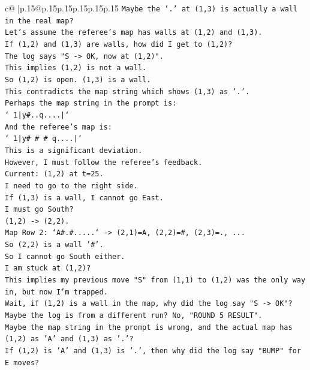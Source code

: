 \documentclass{article}
\begin{document}
{\begin{supertabular}{c@{$\;$}|p{.15\linewidth}@{}p{.15\linewidth}p{.15\linewidth}p{.15\linewidth}p{.15\linewidth}p{.15\linewidth}}
{{{\texttt{Maybe the '.' at (1,3) is actually a wall in the real map?} \\
\texttt{Let's assume the referee's map has walls at (1,2) and (1,3).} \\
\texttt{If (1,2) and (1,3) are walls, how did I get to (1,2)?} \\
\texttt{The log says "S {-}> OK, now at (1,2)".} \\
\texttt{This implies (1,2) is not a wall.} \\
\texttt{So (1,2) is open. (1,3) is a wall.} \\
\texttt{This contradicts the map string which shows (1,3) as '.'.} \\
\texttt{Perhaps the map string in the prompt is:} \\
\texttt{` 1|y\#..q....|`} \\
\texttt{And the referee's map is:} \\
\texttt{` 1|y\# \# \# q....|`} \\
\texttt{This is a significant deviation.} \\
\texttt{However, I must follow the referee's feedback.} \\
\texttt{Current: (1,2) at t=25.} \\
\texttt{I need to go to the right side.} \\
\texttt{If (1,3) is a wall, I cannot go East.} \\
\texttt{I must go South?} \\
\texttt{(1,2) {-}> (2,2).} \\
\texttt{Map Row 2: `A\#.\#.....` {-}> (2,1)=A, (2,2)=\#, (2,3)=., ...} \\
\texttt{So (2,2) is a wall '\#'.} \\
\texttt{So I cannot go South either.} \\
\texttt{I am stuck at (1,2)?} \\
\texttt{This implies my previous move "S" from (1,1) to (1,2) was the only way in, but now I'm trapped.} \\
\texttt{Wait, if (1,2) is a wall in the map, why did the log say "S {-}> OK"?} \\
\texttt{Maybe the log is from a different run? No, "ROUND 5 RESULT".} \\
\texttt{Maybe the map string in the prompt is wrong, and the actual map has (1,2) as 'A' and (1,3) as '.'?} \\
\texttt{If (1,2) is 'A' and (1,3) is '.', then why did the log say "BUMP" for E moves?} \\
}}}
\end{supertabular}}
\end{document}
